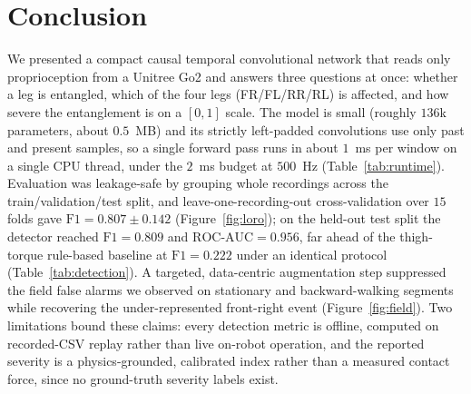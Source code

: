 \section{Conclusion}
We presented a compact causal temporal convolutional network that reads only proprioception from a Unitree Go2 and answers three questions at once: whether a leg is entangled, which of the four legs (FR/FL/RR/RL) is affected, and how severe the entanglement is on a $[0,1]$ scale. The model is small (roughly $136$k parameters, about $0.5$~MB) and its strictly left-padded convolutions use only past and present samples, so a single forward pass runs in about $1$~ms per window on a single CPU thread, under the $2$~ms budget at $500$~Hz (Table~\ref{tab:runtime}). Evaluation was leakage-safe by grouping whole recordings across the train/validation/test split, and leave-one-recording-out cross-validation over $15$ folds gave $\mathrm{F1}=0.807\pm0.142$ (Figure~\ref{fig:loro}); on the held-out test split the detector reached $\mathrm{F1}=0.809$ and $\mathrm{ROC\text{-}AUC}=0.956$, far ahead of the thigh-torque rule-based baseline at $\mathrm{F1}=0.222$ under an identical protocol (Table~\ref{tab:detection}). A targeted, data-centric augmentation step suppressed the field false alarms we observed on stationary and backward-walking segments while recovering the under-represented front-right event (Figure~\ref{fig:field}). Two limitations bound these claims: every detection metric is offline, computed on recorded-CSV replay rather than live on-robot operation, and the reported severity is a physics-grounded, calibrated index rather than a measured contact force, since no ground-truth severity labels exist.